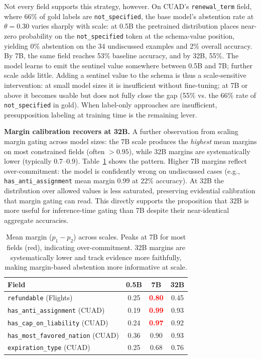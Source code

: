 \documentclass[11pt]{article}
\newcommand{\regress}[1]{\textcolor{red}{\textbf{#1}}}
\begin{document}
Not every field supports this strategy, however. On CUAD's \texttt{renewal\_term} field, where 66\% of gold labels are \texttt{not\_specified}, the base model's abstention rate at $\theta = 0.30$ varies sharply with scale: at 0.5B the pretrained distribution places near-zero probability on the \texttt{not\_specified} token at the schema-value position, yielding 0\% abstention on the 34 undiscussed examples and 2\% overall accuracy. By 7B, the same field reaches 53\% baseline accuracy, and by 32B, 55\%. The model learns to emit the sentinel value somewhere between 0.5B and 7B; further scale adds little. Adding a sentinel value to the schema is thus a scale-sensitive intervention: at small model sizes it is insufficient without fine-tuning; at 7B or above it becomes usable but does not fully close the gap (55\% vs. the 66\% rate of \texttt{not\_specified} in gold). When label-only approaches are insufficient, presupposition labeling at training time is the remaining lever.

\textbf{Margin calibration recovers at 32B.} A further observation from scaling margin gating across model sizes: the 7B scale produces the \emph{highest} mean margins on most constrained fields (often $> 0.95$), while 32B margins are systematically lower (typically $0.7$--$0.9$). Table~\ref{tab:margin_scaling} shows the pattern. Higher 7B margins reflect over-commitment: the model is confidently wrong on undiscussed cases (e.g., \texttt{has\_anti\_assignment} mean margin 0.99 at 22\% accuracy). At 32B the distribution over allowed values is less saturated, preserving evidential calibration that margin gating can read. This directly supports the proposition that 32B is more useful for inference-time gating than 7B despite their near-identical aggregate accuracies.

\begin{table}[h]
\centering
\small
\begin{tabular}{lccc}
\toprule
\textbf{Field} & \textbf{0.5B} & \textbf{7B} & \textbf{32B} \\
\midrule
\texttt{refundable} (Flights)                    & 0.25 & \regress{0.80} & 0.45 \\
\texttt{has\_anti\_assignment} (CUAD)            & 0.19 & \regress{0.99} & 0.93 \\
\texttt{has\_cap\_on\_liability} (CUAD)          & 0.24 & \regress{0.97} & 0.92 \\
\texttt{has\_most\_favored\_nation} (CUAD)       & 0.36 & 0.90 & 0.93 \\
\texttt{expiration\_type} (CUAD)                 & 0.25 & 0.68 & 0.76 \\
\bottomrule
\end{tabular}
\caption{Mean margin ($p_1 - p_2$) across scales. Peaks at 7B for most fields (red), indicating over-commitment. 32B margins are systematically lower and track evidence more faithfully, making margin-based abstention more informative at scale.}
\label{tab:margin_scaling}
\end{table}
\end{document}
